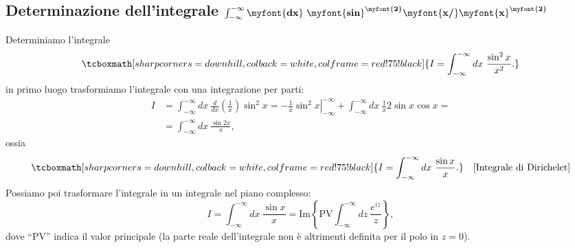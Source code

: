 \subsection{Determinazione dell'integrale $\int _{-\infty} ^{-\infty} \myfont{\textbf{dx}}\ \myfont{\textbf{sin}} ^{\myfont{\textbf{2}}} \myfont{\textbf{x/}}\myfont{\textbf{x}}^{\myfont{\textbf{2}}}$}
Determiniamo l'integrale
	\begin{equation}
		\tcboxmath[sharp corners=downhill, colback=white, colframe=red!75!black]{
			I= \int _{-\infty} ^{-\infty} dx\ \frac{\sin ^2 x}{x^2}.
			}
	\end{equation}
in primo luogo trasformiamo l'integrale con una integrazione per parti:
	\begin{align}
		I &= \int _{-\infty} ^{-\infty} dx\ \frac{d}{dx}\left(\frac{1}{x}\right)\sin ^2 x =  \left. -\frac{1}{x}\sin ^2 x\right\vert _{-\infty} ^{-\infty} +\int _{-\infty} ^{-\infty} dx\ \frac{1}{x} 2 \sin x \cos x  =\nonumber \\
		&= \int _{-\infty} ^{-\infty} dx\ \frac{\sin 2 x}{x}, 
	\end{align}
ossia
	\begin{equation}
		\tcboxmath[sharp corners=downhill, colback=white, colframe=red!75!black]{
		I= \int _{-\infty} ^{-\infty} dx\ \frac{\sin  x}{x}.
		} \quad \textrm{[Integrale di Dirichelet]}
	\end{equation}
Possiamo poi trasformare l'integrale in un integrale nel piano complesso:
	\begin{equation}
		I= \int _{-\infty} ^{-\infty} dx\ \frac{\sin  x}{x}= \textrm{Im}\left\{\textrm{PV} \int _{-\infty} ^{-\infty} dz\ \frac{e^{iz}}{z}\right\},
	\label{eq:cap15_14}
	\end{equation}
dove ``PV'' indica il valor principale (la parte reale dell'integrale non è altrimenti definita per il polo in $z=0$). \newpage

